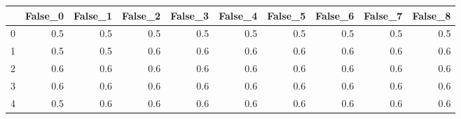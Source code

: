 \begin{tabular}{lrrrrrrrrr}
\toprule
{} &  False\_0 &  False\_1 &  False\_2 &  False\_3 &  False\_4 &  False\_5 &  False\_6 &  False\_7 &  False\_8 \\ \hline
\midrule
0 &      0.5 &      0.5 &      0.5 &      0.5 &      0.5 &      0.5 &      0.5 &      0.5 &      0.5 \\ \hline
1 &      0.5 &      0.5 &      0.6 &      0.6 &      0.6 &      0.6 &      0.6 &      0.6 &      0.6 \\ \hline
2 &      0.6 &      0.6 &      0.6 &      0.6 &      0.6 &      0.6 &      0.6 &      0.6 &      0.6 \\ \hline
3 &      0.6 &      0.6 &      0.6 &      0.6 &      0.6 &      0.6 &      0.6 &      0.6 &      0.6 \\ \hline
4 &      0.5 &      0.6 &      0.6 &      0.6 &      0.6 &      0.6 &      0.6 &      0.6 &      0.6 \\ \hline
\bottomrule
\end{tabular}
